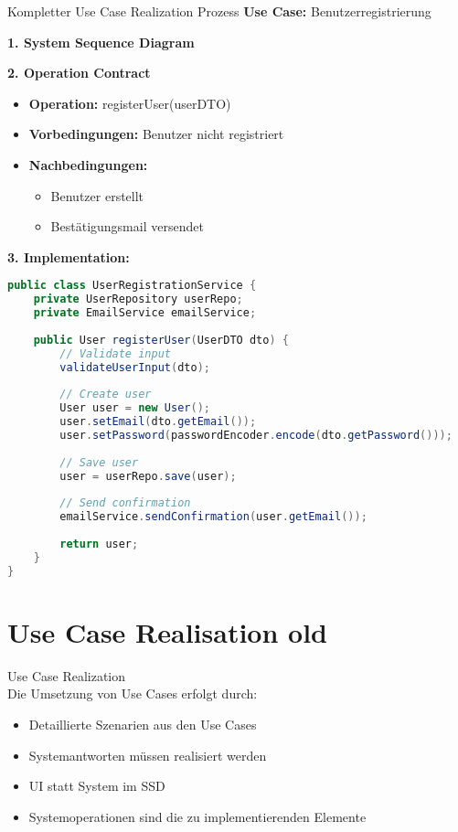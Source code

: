 \begin{example2}{Kompletter Use Case Realization Prozess}
\textbf{Use Case:} Benutzerregistrierung

\textbf{1. System Sequence Diagram}

\textbf{2. Operation Contract}
\begin{itemize}
    \item \textbf{Operation:} registerUser(userDTO)
    \item \textbf{Vorbedingungen:} Benutzer nicht registriert
    \item \textbf{Nachbedingungen:} 
    \begin{itemize}
        \item Benutzer erstellt
        \item Bestätigungsmail versendet
    \end{itemize}
\end{itemize}

\textbf{3. Implementation:}
\begin{lstlisting}[language=Java, style=basesmol]
public class UserRegistrationService {
    private UserRepository userRepo;
    private EmailService emailService;
    
    public User registerUser(UserDTO dto) {
        // Validate input
        validateUserInput(dto);
        
        // Create user
        User user = new User();
        user.setEmail(dto.getEmail());
        user.setPassword(passwordEncoder.encode(dto.getPassword()));
        
        // Save user
        user = userRepo.save(user);
        
        // Send confirmation
        emailService.sendConfirmation(user.getEmail());
        
        return user;
    }
}
\end{lstlisting}
\end{example2}

\section{Use Case Realisation old}

\begin{concept}{Use Case Realization}\\
Die Umsetzung von Use Cases erfolgt durch:
\begin{itemize}
    \item Detaillierte Szenarien aus den Use Cases
    \item Systemantworten müssen realisiert werden
    \item UI statt System im SSD
    \item Systemoperationen sind die zu implementierenden Elemente
\end{itemize}
\end{concept}

